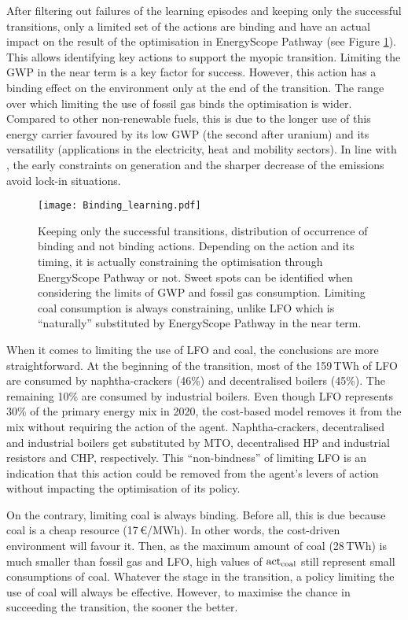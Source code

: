 After filtering out failures of the learning episodes and keeping only the successful transitions, only a limited set of the actions are binding and have an actual impact on the result of the optimisation in EnergyScope Pathway (see Figure \ref{fig:Binding_learning}). This allows identifying key actions to support the myopic transition. Limiting the \gls{GWP} in the near term is a key factor for success. However, this action has a binding effect on the environment only at the end of the transition. The range over which limiting the use of fossil gas binds the optimisation is wider. Compared to other non-renewable fuels, this is due to the longer use of this energy carrier favoured by its low \gls{GWP} (the second after uranium) and its versatility (applications in the electricity, heat and mobility sectors). In line with \citet{vogt2018starting}, the early constraints on generation and the sharper decrease of the emissions avoid lock-in situations.

\begin{figure}[!htbp]
\centering
\texttt{[image: Binding\_learning.pdf]}
\caption{Keeping only the successful transitions, distribution of occurrence of binding and not binding actions. Depending on the action and its timing, it is actually constraining the optimisation through EnergyScope Pathway or not. Sweet spots can be identified when considering the limits of \gls{GWP} and fossil gas consumption. Limiting coal consumption is always constraining, unlike \gls{LFO} which is ``naturally'' substituted by EnergyScope Pathway in the near term.}
\label{fig:Binding_learning}
\end{figure}

When it comes to limiting the use of \gls{LFO} and coal, the conclusions are more straightforward. At the beginning of the transition, most of the 159\,TWh of \gls{LFO} are consumed by naphtha-crackers (46\%) and decentralised boilers (45\%). The remaining 10\% are consumed by industrial boilers. Even though \gls{LFO} represents  30\% of the primary energy mix in 2020, the cost-based model removes it from the mix without requiring the action of the agent. Naphtha-crackers, decentralised and industrial boilers get substituted by \gls{MTO}, decentralised \gls{HP} and industrial resistors and \gls{CHP}, respectively.  This ``non-bindness'' of limiting \gls{LFO} is an indication that this action could be removed from the agent's levers of action without impacting the optimisation of its policy.

On the contrary, limiting coal is always binding. Before all, this is due because coal is a cheap resource (17\,€/MWh). In other words, the cost-driven environment will favour it. Then, as the maximum amount of coal (28\,TWh) is much smaller than fossil gas and \gls{LFO}, high values of $\mathrm{act}\textsubscript{coal}$ still represent small consumptions of coal. Whatever the stage in the transition, a policy limiting the use of coal will always be effective. However, to maximise the chance in succeeding the transition, the sooner the better.

